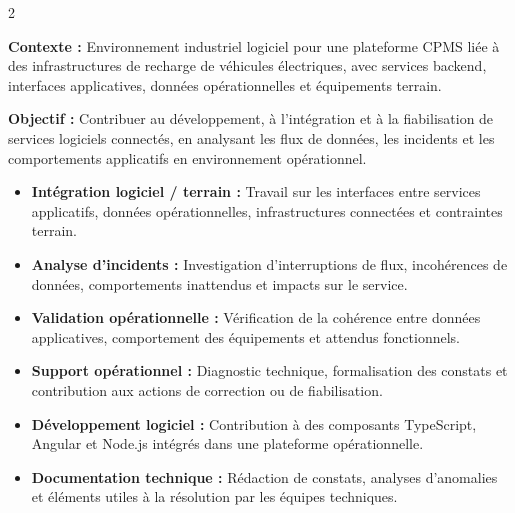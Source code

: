 \documentclass[8pt,a4paper,ragged2e,withhyper]{altacv}
\begin{document}



\makecvheader
\vspace{-0.3cm}


\begin{paracol}{2}



\textbf{Contexte :} Environnement industriel logiciel pour une plateforme CPMS liée à des infrastructures de recharge de véhicules électriques, avec services backend, interfaces applicatives, données opérationnelles et équipements terrain.

\textbf{Objectif :} Contribuer au développement, à l’intégration et à la fiabilisation de services logiciels connectés, en analysant les flux de données, les incidents et les comportements applicatifs en environnement opérationnel.

\begin{itemize}
  \item \textbf{Intégration logiciel / terrain :} Travail sur les interfaces entre services applicatifs, données opérationnelles, infrastructures connectées et contraintes terrain.
  \item \textbf{Analyse d’incidents :} Investigation d’interruptions de flux, incohérences de données, comportements inattendus et impacts sur le service.
  \item \textbf{Validation opérationnelle :} Vérification de la cohérence entre données applicatives, comportement des équipements et attendus fonctionnels.
  \item \textbf{Support opérationnel :} Diagnostic technique, formalisation des constats et contribution aux actions de correction ou de fiabilisation.
  \item \textbf{Développement logiciel :} Contribution à des composants TypeScript, Angular et Node.js intégrés dans une plateforme opérationnelle.
  \item \textbf{Documentation technique :} Rédaction de constats, analyses d’anomalies et éléments utiles à la résolution par les équipes techniques.
\end{itemize}


\end{paracol}
\end{document}
